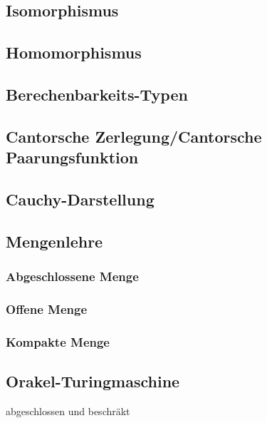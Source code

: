 \documentclass[ngerman]{scrartcl}
\begin{document}
\subsection{Isomorphismus}


\subsection{Homomorphismus}


\subsection{Berechenbarkeits-Typen}


\subsection{Cantorsche Zerlegung/Cantorsche Paarungsfunktion} 


\subsection{Cauchy-Darstellung}


\subsection{Mengenlehre}


\subsubsection{Abgeschlossene Menge}


\subsubsection{Offene Menge}

\subsubsection{Kompakte Menge}

\subsection{Orakel-Turingmaschine}

abgeschlossen und beschräkt
\end{document}
